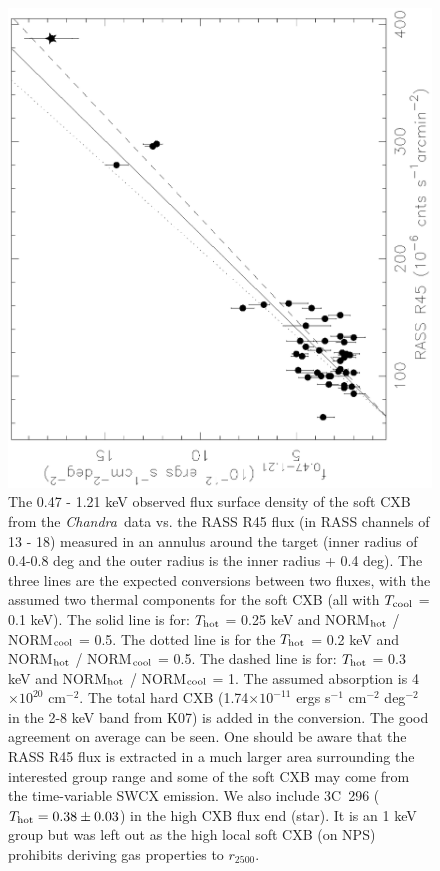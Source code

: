 \documentclass{aastex}
\def\chandra    {{\em Chandra}\/}
\begin{document}
\begin{figure}
\centerline{\includegraphics[height=0.5\linewidth,angle=270]{f2.ps}}
  \caption{The 0.47 - 1.21 keV observed flux surface density of the soft
CXB from the \chandra\ data vs. the RASS R45 flux (in RASS channels of 13 - 18)
measured in an annulus around the target (inner radius of 0.4-0.8 deg and the
outer radius is the inner radius + 0.4 deg). The three lines are the expected
conversions between two fluxes, with the assumed two thermal components for
the soft CXB (all with $T_{\rm cool}$ = 0.1 keV). The solid line is for:
$T_{\rm hot}$ = 0.25 keV and NORM$_{\rm hot}$ / NORM$_{\rm cool}$ = 0.5. The
dotted line is for the $T_{\rm hot}$ = 0.2 keV and NORM$_{\rm hot}$ /
NORM$_{\rm cool}$ = 0.5. The dashed line is for: $T_{\rm hot}$ = 0.3 keV and
NORM$_{\rm hot}$ / NORM$_{\rm cool}$ = 1. The
assumed absorption is 4$\times10^{20}$ cm$^{-2}$. The total hard CXB
(1.74$\times10^{-11}$ ergs s$^{-1}$ cm$^{-2}$ deg$^{-2}$ in the 2-8 keV band
from K07) is added in the conversion. The good agreement on average can be seen.
One should be aware that the RASS R45 flux is extracted in a much larger area
surrounding the interested group range and some of the soft CXB may come from
the time-variable SWCX emission. We also include 3C~296 ($T_{\rm hot} = 0.38 \pm 0.03$)
in the high CXB flux end (star). It is an 1 keV group but was left out
as the high local soft CXB (on NPS) prohibits deriving gas properties to $r_{2500}$. 
}
\end{figure}
\end{document}
